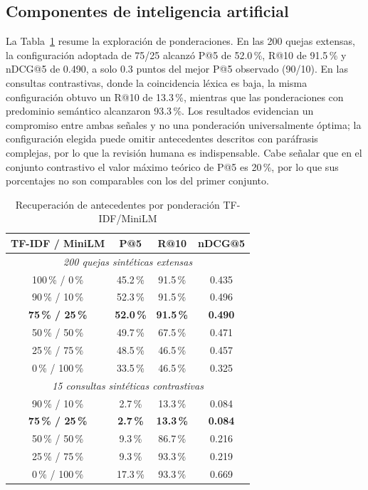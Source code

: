 \documentclass[conference,letterpaper]{IEEEtran}
\begin{document}
\subsection{Componentes de inteligencia artificial}

La Tabla~\ref{tab:rrf} resume la exploración de ponderaciones. En las 200 quejas extensas, la configuración adoptada de 75/25 alcanzó P@5 de 52.0\,\%, R@10 de 91.5\,\% y nDCG@5 de 0.490, a solo 0.3 puntos del mejor P@5 observado (90/10). En las consultas contrastivas, donde la coincidencia léxica es baja, la misma configuración obtuvo un R@10 de 13.3\,\%, mientras que las ponderaciones con predominio semántico alcanzaron 93.3\,\%. Los resultados evidencian un compromiso entre ambas señales y no una ponderación universalmente óptima; la configuración elegida puede omitir antecedentes descritos con paráfrasis complejas, por lo que la revisión humana es indispensable. Cabe señalar que en el conjunto contrastivo el valor máximo teórico de P@5 es 20\,\%, por lo que sus porcentajes no son comparables con los del primer conjunto.

\begin{table}[t]
\caption{Recuperación de antecedentes por ponderación TF-IDF/MiniLM}
\label{tab:rrf}
\centering
\renewcommand{\arraystretch}{1.15}
\begin{tabular}{|c|c|c|c|}
\hline
\textbf{TF-IDF / MiniLM} & \textbf{P@5} & \textbf{R@10} & \textbf{nDCG@5} \\ \hline
\multicolumn{4}{|c|}{\textit{200 quejas sintéticas extensas}} \\ \hline
100\,\% / 0\,\% & 45.2\,\% & 91.5\,\% & 0.435 \\ \hline
90\,\% / 10\,\% & 52.3\,\% & 91.5\,\% & 0.496 \\ \hline
\textbf{75\,\% / 25\,\%} & \textbf{52.0\,\%} & \textbf{91.5\,\%} & \textbf{0.490} \\ \hline
50\,\% / 50\,\% & 49.7\,\% & 67.5\,\% & 0.471 \\ \hline
25\,\% / 75\,\% & 48.5\,\% & 46.5\,\% & 0.457 \\ \hline
0\,\% / 100\,\% & 33.5\,\% & 46.5\,\% & 0.325 \\ \hline
\multicolumn{4}{|c|}{\textit{15 consultas sintéticas contrastivas}} \\ \hline
90\,\% / 10\,\% & 2.7\,\% & 13.3\,\% & 0.084 \\ \hline
\textbf{75\,\% / 25\,\%} & \textbf{2.7\,\%} & \textbf{13.3\,\%} & \textbf{0.084} \\ \hline
50\,\% / 50\,\% & 9.3\,\% & 86.7\,\% & 0.216 \\ \hline
25\,\% / 75\,\% & 9.3\,\% & 93.3\,\% & 0.219 \\ \hline
0\,\% / 100\,\% & 17.3\,\% & 93.3\,\% & 0.669 \\ \hline
\end{tabular}
\end{table}
\end{document}
